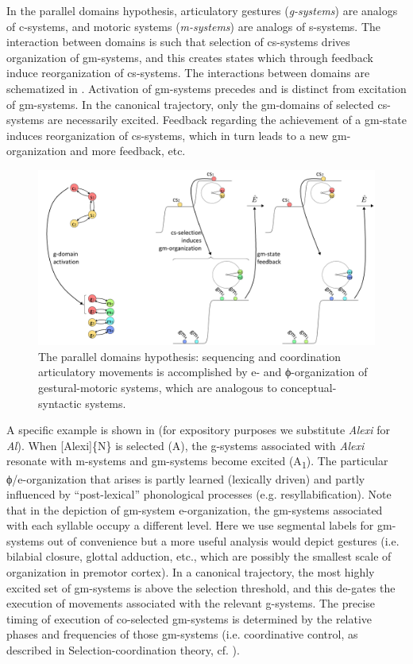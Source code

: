   In the parallel domains hypothesis, articulatory gestures (\textit{g-systems}) are analogs of c-systems, and motoric systems (\textit{m-systems}) are analogs of s-systems. The interaction between domains is such that selection of cs-systems drives organization of gm-systems, and this creates states which through feedback induce reorganization of cs-systems. The interactions between domains are schematized in {}. Activation of gm-systems precedes and is distinct from excitation of gm-systems. In the canonical trajectory, only the gm-domains of selected cs-systems are necessarily excited. Feedback regarding the achievement of a gm-state induces reorganization of cs-systems, which in turn leads to a new gm-organization and more feedback, etc.

  
\begin{figure}
\includegraphics[width=\textwidth]{figures/Tilsen-img54.png}
\caption{The parallel domains hypothesis: sequencing and coordination articulatory movements is accomplished by e- and ϕ-organization of gestural-motoric systems, which are analogous to conceptual-syntactic systems.}
\label{fig:4:4}
\end{figure}
 

  A specific example is shown in {} (for expository purposes we substitute \textit{Alexi} for \textit{Al}). When [Alexi]\{N\} is selected (A), the g-systems associated with \textit{Alexi} resonate with m-systems and gm-systems become excited (A\textsubscript{1}). The particular ϕ/e-organization that arises is partly learned (lexically driven) and partly influenced by “post-lexical” phonological processes (e.g. resyllabification). Note that in the depiction of gm-system e-organization, the gm-systems associated with each syllable occupy a different level. Here we use segmental labels for gm-systems out of convenience but a more useful analysis would depict gestures (i.e. bilabial closure, glottal adduction, etc., which are possibly the smallest scale of organization in premotor cortex). In a canonical trajectory, the most highly excited set of gm-systems is above the selection threshold, and this de-gates the execution of movements associated with the relevant g-systems. The precise timing of execution of co-selected gm-systems is determined by the relative phases and frequencies of those gm-systems (i.e. coordinative control, as described in Selection-coordination theory, cf. \citealt{Tilsen2016,Tilsen2018}). 

